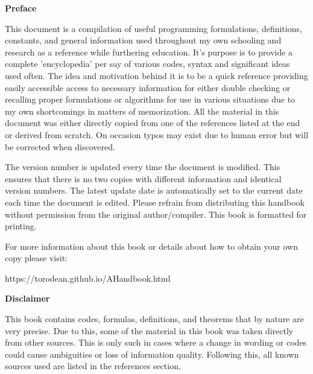 \begin{center}
	\textbf{Preface}
\end{center}

This document is a compilation of useful programming formulations, definitions, constants, and general information used throughout my own schooling and research as a reference while furthering education. It's purpose is to provide a complete 'encyclopedia' per say of various codes, syntax and significant ideas used often. The idea and motivation behind it is to be a quick reference providing easily accessible access to necessary information for either double checking or recalling proper formulations or algorithms for use in various situations due to my own shortcomings in matters of memorization. All the material in this document was either directly copied from one of the references listed at the end or derived from scratch. On occasion typos may exist due to human error but will be corrected when discovered.
	
The version number is updated every time the document is modified. This ensures that there is no two copies with different information and identical version numbers. The latest update date is automatically set to the current date each time the document is edited. Please refrain from distributing this handbook without permission from the original author/compiler. This book is formatted for printing.

For more information about this book or details about how to obtain your own copy please visit:
\begin{center}
	https://torodean.github.io/AHandbook.html
\end{center}
\begin{center}
	\textbf{Disclaimer}
\end{center}

This book contains codes, formulas, definitions, and theorems that by nature are very precise. Due to this, some of the material in this book was taken directly from other sources. This is only such in cases where a change in wording or codes could cause ambiguities or loss of information quality.  Following this, all known sources used are listed in the references section.